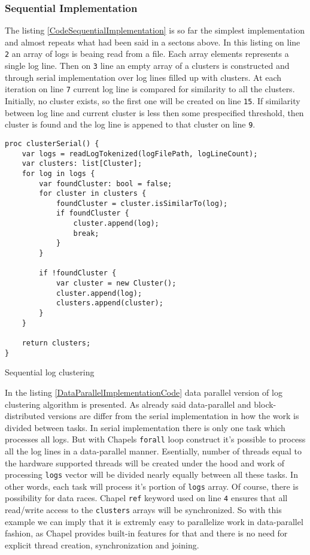 \documentclass{article}
\begin{document}
\subsubsection{Sequential Implementation}\label{SequentialImplementation}
The listing \ref{CodeSequentialImplementation} is so far the simplest implementation and almost repeats what had been said in a sectons above. In this listing on line \texttt{2} an array of logs is beaing read from a file. Each array elements represents a single log line. Then on \texttt{3} line an empty array of a clusters is constructed and through serial implementation over log lines filled up with clusters. At each iteration on line \texttt{7} current log line is compared for similarity to all the clusters. Initially, no cluster exists, so the first one will be created on line \texttt{15}. If similarity between log line and current cluster is less then some prespecified threshold, then cluster is found and the log line is appened to that cluster on line \texttt{9}.
\begin{listing}[H]
\begin{verbatim}
proc clusterSerial() {
	var logs = readLogTokenized(logFilePath, logLineCount);
	var clusters: list[Cluster];
	for log in logs {
		var foundCluster: bool = false;
		for cluster in clusters {
			foundCluster = cluster.isSimilarTo(log);
			if foundCluster {
				cluster.append(log);
				break;
			}
		}

		if !foundCluster {
			var cluster = new Cluster();
			cluster.append(log);
			clusters.append(cluster);
		}
	}

	return clusters;
}
\end{verbatim}
\caption{Sequential log clustering}
\label{CodeSequentialImplementation}
\end{listing}
In the listing \ref{DataParallelImplementationCode} data parallel version of log clustering algorithm is presented. As already said data-parallel and block-distributed versions are differ from the serial implementation in how the work is divided between tasks. In serial implementation there is only one task which processes all logs. But with Chapels \texttt{forall} loop construct it's possible to process all the log lines in a data-parallel manner. Esentially, number of threads equal to the hardware supported threads will be created under the hood and work of processing \texttt{logs} vector will be divided nearly equally between all these tasks. In other words, each task will process it's portion of \texttt{logs} array. Of course, there is possibility for data races. Chapel \texttt{ref} keyword used on line \texttt{4} ensures that all read/write access to the \texttt{clusters} arrays will be synchronized. So with this example we can imply that it is extremly easy to parallelize work in data-parallel fashion, as Chapel provides built-in features for that and there is no need for explicit thread creation, synchronization and joining.
\end{document}
